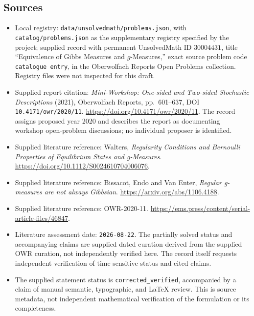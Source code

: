 \documentclass[11pt]{article}
\begin{document}
\subsection{Sources}
\begin{itemize}
\item Local registry: \texttt{data/unsolvedmath/problems.json}, with \texttt{catalog/problems.json} as the supplementary registry specified by the project; supplied record with permanent UnsolvedMath ID \(30004431\), title ``Equivalence of Gibbs Measures and \(g\)-Measures,'' exact source problem code \texttt{catalogue entry}, in the Oberwolfach Reports Open Problems collection. Registry files were not inspected for this draft.
\item Supplied report citation: \emph{Mini-Workshop: One-sided and Two-sided Stochastic Descriptions} (2021), Oberwolfach Reports, pp.\ 601--637, DOI \texttt{10.4171/owr/2020/11}. \url{https://doi.org/10.4171/owr/2020/11}. The record assigns proposed year 2020 and describes the report as documenting workshop open-problem discussions; no individual proposer is identified.
\item Supplied literature reference: Walters, \emph{Regularity Conditions and Bernoulli Properties of Equilibrium States and g-Measures}. \url{https://doi.org/10.1112/S0024610704006076}.
\item Supplied literature reference: Bissacot, Endo and Van Enter, \emph{Regular g-measures are not always Gibbsian}. \url{https://arxiv.org/abs/1106.4188}.
\item Supplied literature reference: OWR-2020-11. \url{https://ems.press/content/serial-article-files/46847}.
\item Literature assessment date: \texttt{2026-08-22}. The partially solved status and accompanying claims are supplied dated curation derived from the supplied OWR curation, not independently verified here. The record itself requests independent verification of time-sensitive status and cited claims.
\item The supplied statement status is \texttt{corrected\_verified}, accompanied by a claim of manual semantic, typographic, and LaTeX review. This is source metadata, not independent mathematical verification of the formulation or its completeness.
\end{itemize}
\end{document}
